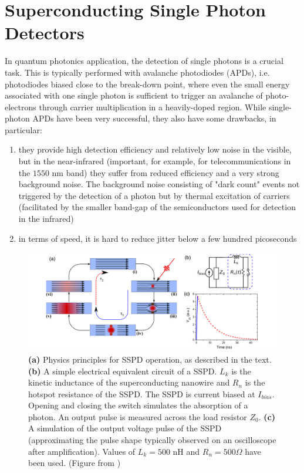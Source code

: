 \documentclass[a4paper,11pt]{article}
\begin{document}
\section {Superconducting Single Photon Detectors}
In quantum photonics application, the detection of single photons is a crucial task. This is typically performed with avalanche photodiodes (APDs), i.e. photodiodes biased close to the break-down point, where even the small energy associated with one single photon is sufficient to trigger an avalanche of photo-electrons through carrier multiplication in a heavily-doped region. While single-photon APDs have been very successful, they also have some drawbacks, in particular:
\begin{enumerate}
    \item they provide high detection efficiency and relatively low noise in the visible, but in the near-infrared (important, for example, for telecommunications in the $1550$ nm band) they suffer from reduced efficiency and a very strong background noise. The background noise consisting of "dark count" events not triggered by the detection of a photon but by thermal excitation of carriers (facilitated by the smaller band-gap of the semiconductors used for detection in the infrared)
    \item in terms of speed, it is hard to reduce jitter below a few hundred picoseconds
\end{enumerate}

\begin{figure}[h]
\centering
\includegraphics[width = 1\textwidth]{figures/SSPD_operation.png}
\caption{{\bf (a)} Physics principles for SSPD operation, as described in the text. {\bf (b)}  A simple electrical equivalent circuit of a SSPD. $L_k$ is the kinetic inductance of the superconducting nanowire and $R_n$ is the hotspot resistance of the SSPD. The SSPD is current biased at $I_{bias}$. Opening and closing the switch simulates the absorption of a photon. An output pulse is measured across the load resistor $Z_0$. {\bf (c)} A simulation of the output voltage pulse of the SSPD (approximating the pulse shape typically observed on an oscilloscope after amplification). Values of $L_k=500$ nH and $R_n=500 \Omega$ have been used. (Figure from \cite{natarajan_superconducting_2012})}
\label{fig:SSPD_oper}
\end{figure}
\end{document}
